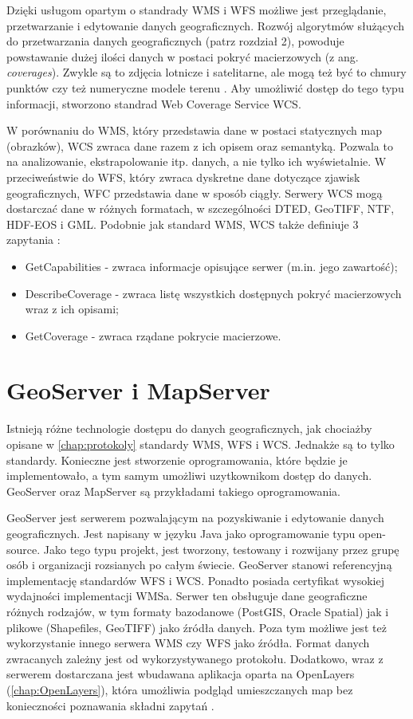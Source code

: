 Dzięki usługom opartym o standrady WMS i WFS możliwe jest przeglądanie, przetwarzanie i edytowanie danych geograficznych.
Rozwój algorytmów służących do przetwarzania danych geograficznych (patrz rozdział 2), powoduje powstawanie dużej ilości danych w postaci pokryć macierzowych
(z ang. \textit{coverages}). Zwykle są to zdjęcia lotnicze i satelitarne, ale mogą też być to chmury punktów czy też numeryczne modele terenu \cite{sudra2012}.
Aby umożliwić dostęp do tego typu informacji, stworzono standrad Web Coverage Service WCS.

W porównaniu do WMS, który przedstawia dane w postaci statycznych map (obrazków), WCS zwraca dane razem z ich opisem oraz semantyką.
Pozwala to na analizowanie, ekstrapolowanie itp. danych, a nie tylko ich wyświetalnie.
W przeciweństwie do WFS, który zwraca dyskretne dane dotyczące zjawisk geograficznych, WFC przedstawia dane w sposób ciągły.
Serwery WCS mogą dostarczać dane w różnych formatach, w szczególności DTED, GeoTIFF, NTF, HDF-EOS i GML. Podobnie jak standard WMS,
WCS także definiuje 3 zapytania \cite{OpenGIS_WCS2012}:
\begin{itemize}
    \item GetCapabilities - zwraca informacje opisujące serwer (m.in. jego zawartość);
    \item DescribeCoverage - zwraca listę wszystkich dostępnych pokryć macierzowych wraz z ich opisami;
    \item GetCoverage - zwraca rządane pokrycie macierzowe.
\end{itemize}

\section{GeoServer i MapServer}

Istnieją różne technologie dostępu do danych geograficznych, jak chociażby opisane w \autoref{chap:protokoly} standardy WMS, WFS i WCS.
Jednakże są to tylko standardy. Konieczne jest stworzenie oprogramowania, które będzie je implementowało, a tym samym umożliwi
uzytkownikom dostęp do danych. GeoServer oraz MapServer są przykładami takiego oprogramowania.

GeoServer jest serwerem pozwalającym na pozyskiwanie i edytowanie danych geograficznych.
Jest napisany w języku Java jako oprogramowanie typu open-source.
Jako tego typu projekt, jest tworzony, testowany i rozwijany przez grupę osób i organizacji rozsianych po całym świecie.
GeoServer stanowi referencyjną implementację standardów WFS i WCS. Ponadto posiada certyfikat wysokiej wydajności implementacji WMSa.
Serwer ten obsługuje dane geograficzne różnych rodzajów, w tym formaty bazodanowe (PostGIS, Oracle Spatial) jak i plikowe (Shapefiles, GeoTIFF)
jako źródła danych. Poza tym możliwe jest też wykorzystanie innego serwera WMS czy WFS jako źródła.
Format danych zwracanych zależny jest od wykorzystywanego protokołu. Dodatkowo, wraz z serwerem dostarczana jest wbudawana aplikacja
oparta na OpenLayers (\ref{chap:OpenLayers}), która umożliwia podgląd umieszczanych map bez konieczności poznawania składni zapytań \cite{GeoServerManual2016}.

